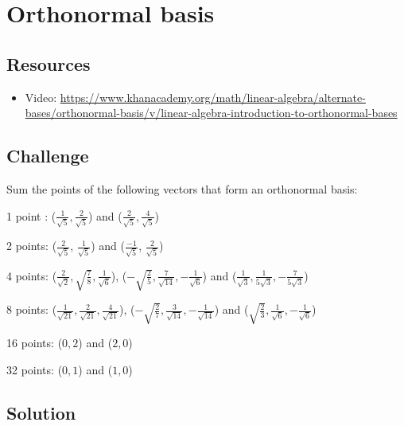 \section{Orthonormal basis}

\subsection*{Resources}
\begin{itemize}
    \item Video: \url{https://www.khanacademy.org/math/linear-algebra/alternate-bases/orthonormal-basis/v/linear-algebra-introduction-to-orthonormal-bases}
\end{itemize}

\subsection*{Challenge}
Sum the points of the following vectors that form an orthonormal basis:

1 point :
($\displaystyle \frac{1}{\sqrt{5}}, \frac{2}{\sqrt{5}}$) and
($\displaystyle \frac{2}{\sqrt{5}}, \frac{4}{\sqrt{5}}$)

2 points:
($\displaystyle \frac{2}{\sqrt{5}}$, $\displaystyle \frac{1}{\sqrt{5}}$) and
($\displaystyle \frac{-1}{\sqrt{5}}$, $\displaystyle \frac{2}{\sqrt{5}}$)

4 points:
($\displaystyle \frac{2}{\sqrt{2}}, \sqrt{\frac{7}{8}}, \frac{1}{\sqrt{6}}$),
($\displaystyle -\sqrt{\frac{2}{5}}, \frac{7}{\sqrt{14}}, -\frac{1}{\sqrt{6}}$) and
($\displaystyle \frac{1}{\sqrt{3}},  \frac{1}{5 \sqrt{3}}, -\frac{7}{5 \sqrt{3}}$)

8 points:
($\displaystyle \frac{1}{\sqrt{21}}, \frac{2}{\sqrt{21}}, \frac{4}{\sqrt{21}}$),
($\displaystyle -\sqrt{\frac{2}{7}}, \frac{3}{\sqrt{14}}, -\frac{1}{\sqrt{14}}$) and
($\displaystyle \sqrt{\frac{2}{3}},  \frac{1}{\sqrt{6}}, -\frac{1}{\sqrt{6}}$)


16 points:
($0, 2$) and ($2, 0$)

32 points:
($0, 1$) and ($1, 0$)

\subsection*{Solution}




